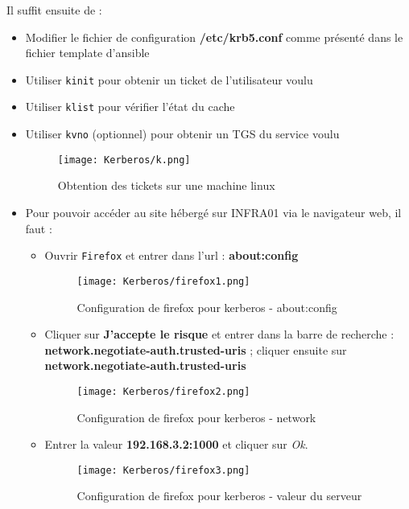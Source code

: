 Il suffit ensuite de : 
\begin{itemize}
    \item Modifier le fichier de configuration 
 \textbf{/etc/krb5.conf} comme présenté dans le fichier template d'ansible
    \item Utiliser \texttt{kinit} pour obtenir un ticket de l'utilisateur voulu
    \item Utiliser \texttt{klist} pour vérifier l'état du cache
    \item Utiliser \texttt{kvno} (optionnel) pour obtenir un TGS du service voulu
     \begin{figure}[h!]
     \begin{center}
         \texttt{[image: Kerberos/k.png]}
         \caption{Obtention des tickets sur une machine linux}
         \label{Debian_screenshots/Config/5}
     \end{center}
  \end{figure}
  \FloatBarrier
  
  \item Pour pouvoir accéder au site hébergé sur INFRA01 via le navigateur web, il faut : 
  \begin{itemize}
      \item Ouvrir \texttt{Firefox} et entrer dans l'url : {\NoAutoSpacing\textbf{about:config}}
        \begin{figure}[h!]
     \begin{center}
         \texttt{[image: Kerberos/firefox1.png]}
         \caption{Configuration de firefox pour kerberos - {\NoAutoSpacing about:config}}
         \label{Debian_screenshots/Config/5}
     \end{center}
  \end{figure}

\pagebreak
  \item Cliquer sur \textbf{J'accepte le risque} et entrer dans la barre de recherche : \textbf{network.negotiate-auth.trusted-uris} ; cliquer ensuite sur \textbf{network.negotiate-auth.trusted-uris}  
     \begin{figure}[h!]
     \begin{center}
         \texttt{[image: Kerberos/firefox2.png]}
         \caption{Configuration de firefox pour kerberos - network}
         \label{Debian_screenshots/Config/5}
     \end{center}
  \end{figure}
  \FloatBarrier
  
  \item Entrer la valeur {\NoAutoSpacing \textbf{192.168.3.2:1000}} et cliquer sur \textit{Ok}.
    \begin{figure}[h!]
     \begin{center}
         \texttt{[image: Kerberos/firefox3.png]}
         \caption{Configuration de firefox pour kerberos - valeur du serveur}
         \label{Debian_screenshots/Config/5}
     \end{center}
  \end{figure}
  \FloatBarrier
  \end{itemize}


\end{itemize}
